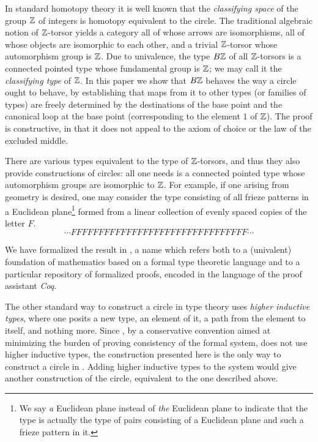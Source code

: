 \documentclass[a4paper,12pt]{amsart}
\begin{document}
In standard homotopy theory it is well known that the {\em classifying space} of the group $\mathbb{Z}$ of integers is homotopy equivalent to the
circle.  The traditional algebraic notion of $\mathbb{Z}$-torsor yields a category all of whose arrows are isomorphisms, all of whose objects are
isomorphic to each other, and a trivial $\mathbb{Z}$-torsor whose automorphism group is $\mathbb{Z}$.  Due to univalence, the type $B\mathbb{Z}$ of all $\mathbb{Z}$-torsors
is a connected pointed type whose fundamental group is $\mathbb{Z}$; we may call it the {\em classifying type} of $\mathbb{Z}$.  In this paper we show that
$B\mathbb{Z}$ behaves the way a circle ought to behave, by establishing that maps from it to other types (or families of types) are freely determined
by the destinations of the base point and the canonical loop at the base point (corresponding to the element $1$ of $\mathbb{Z}$).  The proof is
constructive, in that it does not appeal to the axiom of choice or the law of the excluded middle.

There are various types equivalent to the type of $\mathbb{Z}$-torsors, and thus they also provide constructions of circles: all one needs is a
connected pointed type whose automorphism groups are isomorphic to $\mathbb{Z}$.  For example, if one arising from geometry is desired, one may
consider the type consisting of all frieze patterns in a Euclidean plane\footnote{We say \emph{a} Euclidean plane instead of {\em the} Euclidean
  plane to indicate that the type is actually the type of pairs consisting of a Euclidean plane and such a frieze pattern in it.} formed from a
linear collection of evenly spaced copies of the letter $F$.
$$ \cdots FFFFFFFFFFFFFFFFFFFFFFFFFFFFFFFF \cdots $$

We have formalized the result in \UniMath{}, a name which refers both to a (univalent) foundation of mathematics based on a formal type theoretic
language and to a particular repository \cite{UniMath} of formalized proofs, encoded in the language of the proof assistant {\em Coq}.

The other standard way to construct a circle in type theory uses {\em higher inductive types}, where one posits a new type, an element of it, a
path from the element to itself, and nothing more.  Since {\UniMath}, by a conservative convention aimed at minimizing the burden of proving
consistency of the formal system, does not use higher inductive types, the construction presented here is the only way to construct a circle in
\UniMath{}.  Adding higher inductive types to the system would give another construction of the circle, equivalent to the one described above.
\end{document}
